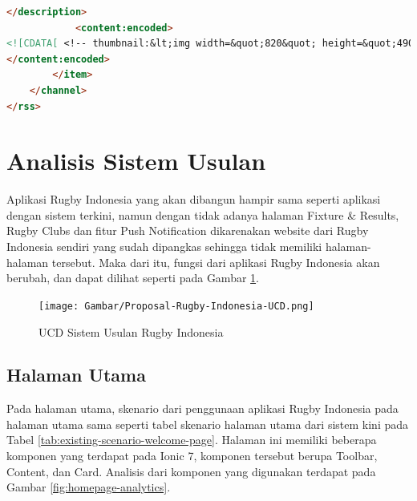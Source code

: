 \begin{lstlisting}[language=HTML, caption=Potongan Kode RSS Rugby Indonesia, label=kode:rss-rugby-indonesia]
</description>
            <content:encoded>
<![CDATA[ <!-- thumbnail:&lt;img width=&quot;820&quot; height=&quot;490&quot; src=&quot;https://rugbyindonesia.or.id/wp-content/uploads/2024/01/Kaltim-820x490.jpg&quot; class=&quot;attachment-post-thumbnail size-post-thumbnail wp-post-image&quot; alt=&quot;&quot; decoding=&quot;async&quot; /&gt;--><!-- wp:paragraph --> <p>2 Januari 2024, [NEWS] Kalimantan Timur semangat menjalankan program Rugby Masuk Sekolah. Pengurus PRUI Kalimantan Timur langsung mulai di SDN 12 Sambutan, Samarinda. Target awalnya, PRUI Kalimantan Timur akan menjalankan program ini di 8 sekolah.</p> <!-- /wp:paragraph --> ]]>
</content:encoded>
        </item>
    </channel>
</rss>
\end{lstlisting}


\section{Analisis Sistem Usulan}
Aplikasi Rugby Indonesia yang akan dibangun hampir sama seperti aplikasi dengan sistem terkini, namun dengan tidak adanya halaman Fixture \& Results, Rugby Clubs dan fitur Push Notification dikarenakan website dari Rugby Indonesia sendiri yang sudah dipangkas sehingga tidak memiliki halaman-halaman tersebut. Maka dari itu, fungsi dari aplikasi Rugby Indonesia akan berubah, dan dapat dilihat seperti pada Gambar \ref{fig:proposal-ucd-rugby-indonesia}.

\begin{figure} [H]
    \centering
    \texttt{[image: Gambar/Proposal-Rugby-Indonesia-UCD.png]}
    \caption{UCD Sistem Usulan Rugby Indonesia}
    \label{fig:proposal-ucd-rugby-indonesia}
\end{figure}

\subsection{Halaman Utama}
Pada halaman utama, skenario dari penggunaan aplikasi Rugby Indonesia pada halaman utama sama seperti tabel skenario halaman utama dari sistem kini pada Tabel \ref{tab:existing-scenario-welcome-page}. Halaman ini memiliki beberapa komponen yang terdapat pada Ionic 7, komponen tersebut berupa Toolbar, Content, dan Card. Analisis dari komponen yang digunakan terdapat pada Gambar \ref{fig:homepage-analytics}.

